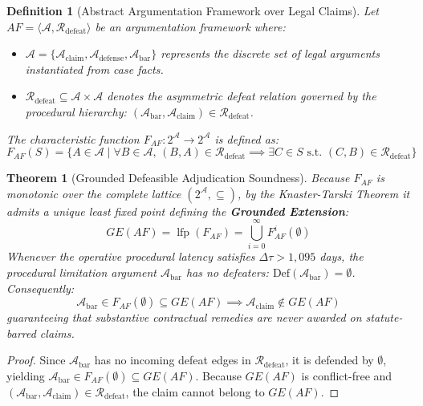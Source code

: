\documentclass[11pt,a4paper]{article}
\newtheorem{theorem}{Theorem}
\newtheorem{definition}{Definition}
\begin{document}
\begin{definition}[Abstract Argumentation Framework over Legal Claims]
Let $AF = \langle \mathcal{A}, \mathcal{R}_{\mathrm{defeat}} \rangle$ be an argumentation framework where:
\begin{itemize}[leftmargin=*]
    \item $\mathcal{A} = \{\mathcal{A}_{\mathrm{claim}}, \mathcal{A}_{\mathrm{defense}}, \mathcal{A}_{\mathrm{bar}}\}$ represents the discrete set of legal arguments instantiated from case facts.
    \item $\mathcal{R}_{\mathrm{defeat}} \subseteq \mathcal{A} \times \mathcal{A}$ denotes the asymmetric defeat relation governed by the procedural hierarchy: $(\mathcal{A}_{\mathrm{bar}}, \mathcal{A}_{\mathrm{claim}}) \in \mathcal{R}_{\mathrm{defeat}}$.
\end{itemize}
The characteristic function $F_{AF}: 2^{\mathcal{A}} \to 2^{\mathcal{A}}$ is defined as:
\begin{equation}
F_{AF}(S) = \{ A \in \mathcal{A} \mid \forall B \in \mathcal{A}, \, (B, A) \in \mathcal{R}_{\mathrm{defeat}} \implies \exists C \in S \text{ s.t. } (C, B) \in \mathcal{R}_{\mathrm{defeat}} \}
\end{equation}
\end{definition}

\begin{theorem}[Grounded Defeasible Adjudication Soundness]
\label{thm:grounded_soundness}
Because $F_{AF}$ is monotonic over the complete lattice $(2^{\mathcal{A}}, \subseteq)$, by the Knaster-Tarski Theorem it admits a unique least fixed point defining the \textbf{Grounded Extension}:
\begin{equation}
GE(AF) = \operatorname{lfp}(F_{AF}) = \bigcup_{i=0}^\infty F_{AF}^i(\emptyset)
\end{equation}
Whenever the operative procedural latency satisfies $\Delta\tau > 1,095$ days, the procedural limitation argument $\mathcal{A}_{\mathrm{bar}}$ has no defeaters: $\text{Def}(\mathcal{A}_{\mathrm{bar}}) = \emptyset$. Consequently:
\begin{equation}
\mathcal{A}_{\mathrm{bar}} \in F_{AF}(\emptyset) \subseteq GE(AF) \implies \mathcal{A}_{\mathrm{claim}} \notin GE(AF)
\end{equation}
guaranteeing that substantive contractual remedies are never awarded on statute-barred claims.
\end{theorem}

\begin{proof}
Since $\mathcal{A}_{\mathrm{bar}}$ has no incoming defeat edges in $\mathcal{R}_{\mathrm{defeat}}$, it is defended by $\emptyset$, yielding $\mathcal{A}_{\mathrm{bar}} \in F_{AF}(\emptyset) \subseteq GE(AF)$. Because $GE(AF)$ is conflict-free and $(\mathcal{A}_{\mathrm{bar}}, \mathcal{A}_{\mathrm{claim}}) \in \mathcal{R}_{\mathrm{defeat}}$, the claim cannot belong to $GE(AF)$.
\end{proof}
\end{document}

